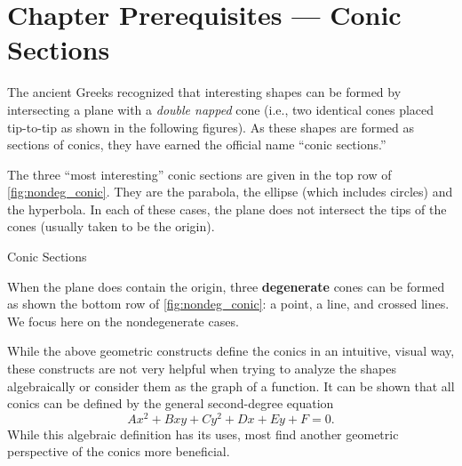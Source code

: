 \section{Chapter Prerequisites --- Conic Sections}
\label{sec:conic_sections}

\prereqIntro

The ancient Greeks recognized that interesting shapes can be formed by intersecting a plane with a 
\emph{double napped} cone (i.e., two identical cones placed tip-to-tip as shown in the following figures). As these shapes are formed as sections of conics, they have earned the official name ``conic sections.''

The three ``most interesting'' conic sections are given in the top row of \autoref{fig:nondeg_conic}. They are the parabola, the ellipse (which includes circles) and the hyperbola. In each of these cases, the plane does not intersect the tips of the cones (usually taken to be the origin).

\noindent\begin{minipage}[t]{\linewidth}\noindent%
\captionsetup{type=figure}%
\caption{Conic Sections}\label{fig:nondeg_conic}
\end{minipage}

When the plane does contain the origin, three \textbf{degenerate} cones can be formed as shown the bottom row of \autoref{fig:nondeg_conic}: a point, a line, and crossed lines. We focus here on the nondegenerate cases.

While the above geometric constructs define the conics in an intuitive, visual way, these constructs are not very helpful when trying to analyze the shapes algebraically or consider them as the graph of a function. It can be shown that all conics can be defined by the general second-degree equation
\[Ax^2+B xy+Cy^2+Dx+Ey+F=0.\]
While this algebraic definition has its uses, most find another geometric perspective of the conics more beneficial.

